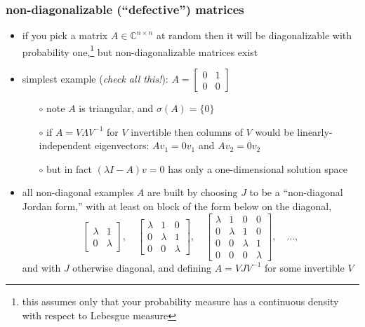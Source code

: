 \documentclass[10pt,hyperref]{beamer}
\newcommand{\CC}{\mathbb{C}}
\begin{document}
\begin{frame}[fragile]
\frametitle{non-diagonalizable (``defective'') matrices}

\begin{itemize}
\item if you pick a matrix $A\in\CC^{n\times n}$ at random then it will be diagonalizable with probability one,\footnote{this assumes only that your probability measure has a continuous density with respect to Lebesgue measure} but non-diagonalizable matrices exist
\item simplest example (\emph{check all this!}): \quad $A = \begin{bmatrix} 0 & 1 \\ 0 & 0 \end{bmatrix}$
    \begin{itemize}
    \item[$\circ$] note $A$ is triangular, and $\sigma(A) = \{0\}$
    \item[$\circ$] if $A=V\Lambda V^{-1}$ for $V$ invertible then columns of $V$ would be linearly-independent eigenvectors: $Av_1=0v_1$ and $Av_2=0v_2$
    \item[$\circ$] but in fact $(\lambda I - A) v = 0$ has only a one-dimensional solution space
    \end{itemize}
\item all non-diagonal examples $A$ are built by choosing $J$ to be a ``non-diagonal Jordan form,'' with at least on block of the form below on the diagonal,
\footnotesize
    $$\begin{bmatrix} \lambda & 1 \\ 0 & \lambda \end{bmatrix}, \quad \begin{bmatrix} \lambda & 1 & 0 \\ 0 & \lambda & 1 \\ 0 & 0 & \lambda \end{bmatrix}, \quad \begin{bmatrix} \lambda & 1 & 0 & 0 \\ 0 & \lambda & 1 & 0 \\ 0 & 0 & \lambda & 1 \\ 0 & 0 & 0 & \lambda \end{bmatrix}, \quad \dots,$$
\normalsize
and with $J$ otherwise diagonal, and defining $A=VJV^{-1}$ for some invertible $V$
\end{itemize}
\end{frame}
\end{document}
